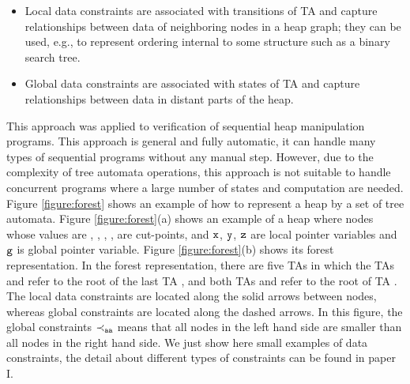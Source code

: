  \begin{itemize}
 	\item Local data constraints are associated with transitions of TA  and capture relationships between data of neighboring nodes in a heap graph; they can be used, e.g., to represent ordering internal to some structure  such as a binary search tree.
 	\item Global data constraints are associated with states of TA and capture relationships between data in distant parts of the heap.
 \end{itemize}
  This approach was applied to verification of sequential heap manipulation programs. This approach is general and fully automatic, it can handle many types of sequential programs without any manual step. However, due to the complexity of tree automata operations, this approach is not suitable to handle concurrent programs where a large number of states and computation are needed. Figure \ref{figure:forest} shows an example of how to represent a heap by a set of tree automata. Figure \ref{figure:forest}(a) shows an example of a heap where nodes whose values are \nodea, \nodeb, \nodec, \noded, \nodee \; are cut-points, and $\tt x$, $\tt y$, $\tt z$ are local pointer variables and $\tt g$ is global pointer variable. Figure \ref{figure:forest}(b) shows its forest representation. In the forest representation, there are five TAs in which the TAs \taa \; and \tac \; refer to the root of the last TA \tae\;, and both TAs \tab \; and \tad \; refer to the root of TA \tac \;. The local data constraints are located along the solid arrows between nodes, whereas global constraints are located along the dashed arrows. In this figure, the global constraints $\tt \prec_{aa}$ means that all nodes in the left hand side are smaller than all nodes in the right hand side.  We just show here small examples of data constraints, the detail about different types of constraints can be found in paper I.   

